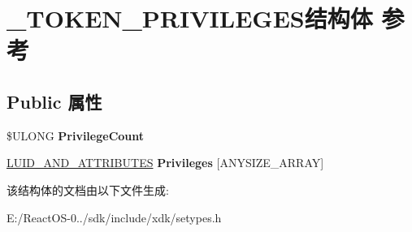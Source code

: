 \hypertarget{struct___t_o_k_e_n___p_r_i_v_i_l_e_g_e_s}{}\section{\+\_\+\+T\+O\+K\+E\+N\+\_\+\+P\+R\+I\+V\+I\+L\+E\+G\+E\+S结构体 参考}
\label{struct___t_o_k_e_n___p_r_i_v_i_l_e_g_e_s}
\subsection*{Public 属性}
\begin{DoxyCompactItemize}
\item 
\mbox{\label{struct___t_o_k_e_n___p_r_i_v_i_l_e_g_e_s_a7ede1d11b3b05796fe22ff5ca40707bd}} 
\$U\+L\+O\+NG {\bfseries Privilege\+Count}
\item 
\mbox{\label{struct___t_o_k_e_n___p_r_i_v_i_l_e_g_e_s_aefd3533e806f3225e053dda98b31470b}} 
\hyperlink{struct___l_u_i_d___a_n_d___a_t_t_r_i_b_u_t_e_s}{L\+U\+I\+D\+\_\+\+A\+N\+D\+\_\+\+A\+T\+T\+R\+I\+B\+U\+T\+ES} {\bfseries Privileges} \mbox{[}A\+N\+Y\+S\+I\+Z\+E\+\_\+\+A\+R\+R\+AY\mbox{]}
\end{DoxyCompactItemize}


该结构体的文档由以下文件生成\+:\begin{DoxyCompactItemize}
\item 
E\+:/\+React\+O\+S-\/0../sdk/include/xdk/setypes.\+h\end{DoxyCompactItemize}
